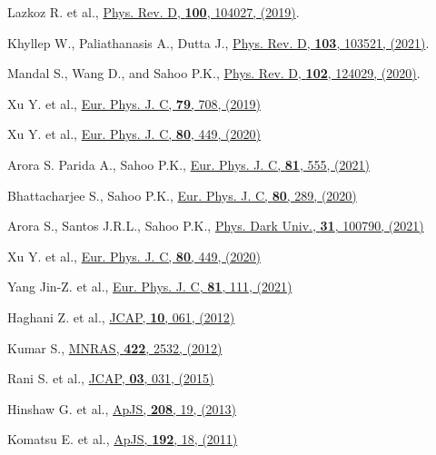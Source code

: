 \begin{thebibliography}{99}
  Lazkoz R. et al., \href{https://journals.aps.org/prd/abstract/10.1103/PhysRevD.100.104027}{Phys. Rev. D, \textbf{100}, 104027, (2019)}.

  Khyllep W., Paliathanasis A., Dutta J., \href{https://doi.org/10.1103/PhysRevD.103.103521}{Phys. Rev. D, \textbf{103}, 103521, (2021)}.

 Mandal S.,  Wang D., and  Sahoo P.K., \href{https://journals.aps.org/prd/abstract/10.1103/PhysRevD.102.124029}{Phys. Rev. D, \textbf{102}, 124029, (2020)}.

 Xu Y. et al., \href{https://doi.org/10.1140/epjc/s10052-019-7207-4}{Eur. Phys. J. C, \textbf{79}, 708, (2019)}

 Xu Y. et al., \href{https://doi.org/10.1140/epjc/s10052-020-8023-6}{Eur. Phys. J. C, \textbf{ 80}, 449, (2020)}

 Arora S. Parida A., Sahoo P.K., \href{https://doi.org/10.1140/epjc/s10052-021-09358-4}{Eur. Phys. J. C, \textbf{81}, 555, (2021)}

 Bhattacharjee S., Sahoo P.K., \href{https://doi.org/10.1140/epjc/s10052-020-7844-7}{Eur. Phys. J. C, \textbf{80}, 289, (2020)}

 Arora S., Santos J.R.L., Sahoo P.K., \href{https://doi.org/10.1016/j.dark.2021.100790}{Phys. Dark Univ., \textbf{31}, 100790, (2021)}

 Xu Y. et al., \href{https://doi.org/10.1140/epjc/s10052-020-8023-6}{Eur. Phys. J. C, \textbf{80}, 449, (2020)}

 Yang Jin-Z. et al., \href{https://doi.org/10.1140/epjc/s10052-021-08910-6}{Eur. Phys. J. C, \textbf{81}, 111, (2021)}

 Haghani Z. et al., \href{https://doi.org/10.1088/1475-7516/2012/10/061}{JCAP, \textbf{10}, 061, (2012)}

 Kumar S., \href{ https://doi.org/10.1111/j.1365-2966.2012.20810.x}{MNRAS, \textbf{422}, 2532, (2012)}

 Rani S. et al., \href{https://doi.org/10.1088/1475-7516/2015/03/031}{JCAP, \textbf{03}, 031, (2015)}

 Hinshaw G. et al., \href{https://doi.org/10.1088/0067-0049/208/2/19}{ApJS, \textbf{208}, 19, (2013)}

 Komatsu E. et al., \href{https://doi.org/10.1088/0067-0049/192/2/18}{ApJS, \textbf{192}, 18, (2011)}


\end{thebibliography}
